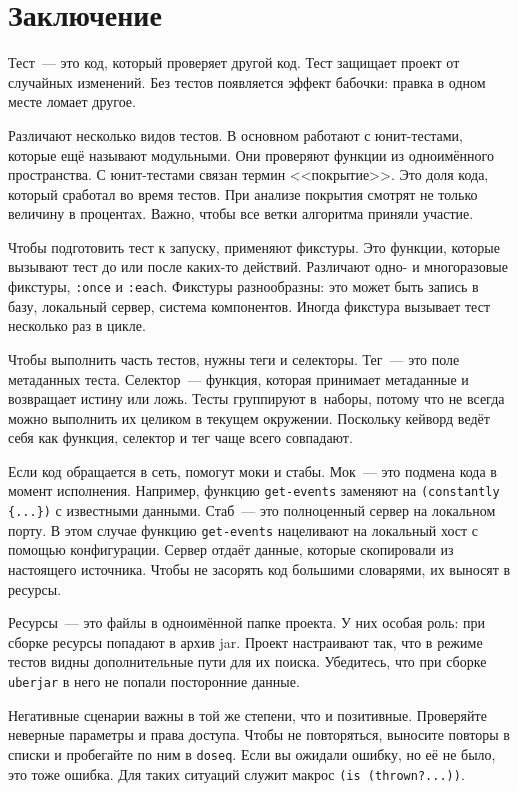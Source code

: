 \section{Заключение}

Тест~--- это код, который проверяет другой код. Тест защищает проект от
случайных изменений. Без тестов появляется эффект бабочки: правка в одном месте
ломает другое.


Различают несколько видов тестов. В основном работают с юнит-тестами, которые
ещё называют модульными. Они проверяют функции из одноимённого пространства. С
юнит-тестами связан термин <<покрытие>>. Это доля кода, который сработал во
время тестов. При анализе покрытия смотрят не только величину в
процентах. Важно, чтобы все ветки алгоритма приняли участие.

Чтобы подготовить тест к запуску, применяют фикстуры. Это функции, которые
вызывают тест до или после каких-то действий. Различают одно- и многоразовые
фикстуры, \verb|:once| и \verb|:each|. Фикстуры разнообразны: это может быть
запись в базу, локальный сервер, система компонентов. Иногда фикстура вызывает
тест несколько раз в цикле.

Чтобы выполнить часть тестов, нужны теги и селекторы. Тег~--- это поле
метаданных теста. Селектор~--- функция, которая принимает метаданные и
возвращает истину или ложь. Тесты группируют в~наборы, потому что не всегда
можно выполнить их целиком в текущем окружении. Поскольку кейворд ведёт себя как
функция, селектор и тег чаще всего совпадают.

Если код обращается в сеть, помогут моки и стабы. Мок~--- это подмена кода в
момент исполнения. Например, функцию \verb|get-events| заменяют на
\verb|(constantly {...})| с известными данными. Стаб~--- это полноценный сервер
на локальном порту. В этом случае функцию \verb|get-events| нацеливают на
локальный хост с помощью конфигурации. Сервер отдаёт данные, которые скопировали
из настоящего источника. Чтобы не засорять код большими словарями, их выносят в
ресурсы.

Ресурсы~--- это файлы в одноимённой папке проекта. У них особая роль: при сборке
ресурсы попадают в архив jar. Проект настраивают так, что в режиме тестов видны
дополнительные пути для их поиска. Убедитесь, что при сборке \verb|uberjar| в
него не попали посторонние данные.

Негативные сценарии важны в той же степени, что и позитивные. Проверяйте
неверные параметры и права доступа. Чтобы не повторяться, выносите повторы в
списки и пробегайте по ним в \verb|doseq|. Если вы ожидали ошибку, но её не
было, это тоже ошибка. Для таких ситуаций служит макрос
\verb|(is (thrown?...))|.

